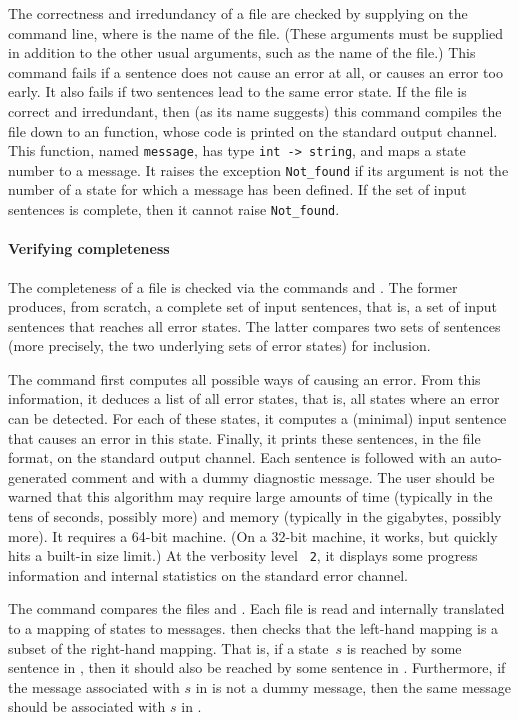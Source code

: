 \documentclass[onecolumn,11pt,nocopyrightspace,preprint]{sigplanconf}
\begin{document}
The correctness and irredundancy of a \messages file are checked by supplying
\ocompileerrors {} on the command line, where  is the
name of the \messages file. (These arguments must be supplied in addition to
the other usual arguments, such as the name of the \mly file.) This command
fails if a sentence does not cause an error at all, or causes an error too
early. It also fails if two sentences lead to the same error state.
%
If the file is correct and irredundant, then (as its name suggests) this
command compiles the \messages file down to an \ocaml function, whose code
is printed on the standard output channel. This function, named \verb+message+,
has type \verb+int -> string+, and maps a state number to a message. It
raises the exception \verb+Not_found+ if its argument is not the number of
a state for which a message has been defined. If the set of input sentences
is complete, then it cannot raise \verb+Not_found+.

\paragraph{Verifying completeness}

The completeness of a \messages file is checked via the commands \olisterrors
and \ocompareerrors. The former produces, from scratch, a complete set of
input sentences, that is, a set of input sentences that reaches all error
states. The latter compares two sets of sentences (more precisely, the two
underlying sets of error states) for inclusion.

The command \olisterrors first computes all possible ways of causing an error.
From this information, it deduces a list of all error states, that is, all
states where an error can be detected. For each of these states, it computes a
(minimal) input sentence that causes an error in this state. Finally, it
prints these sentences, in the \messages file format, on the standard output
channel. Each sentence is followed with an auto-generated comment and with a
dummy diagnostic message. The user should be warned that this algorithm may
require large amounts of time (typically in the tens of seconds, possibly
more) and memory (typically in the gigabytes, possibly more). It requires a
64-bit machine. (On a 32-bit machine, it works, but quickly hits a built-in
size limit.) At the verbosity level \ologautomaton~\texttt{2}, it displays
some progress information and internal statistics on the standard error
channel.

The command \ocompareerrors {} \ocompareerrors {}
compares the \messages files  and . Each file is
read and internally translated to a mapping of states to messages. \menhir
then checks that the left-hand mapping is a subset of the right-hand mapping.
That is, if a state~$s$ is reached by some sentence in , then it
should also be reached by some sentence in . Furthermore, if the
message associated with $s$ in  is not a dummy message, then the
same message should be associated with $s$ in .
\end{document}
